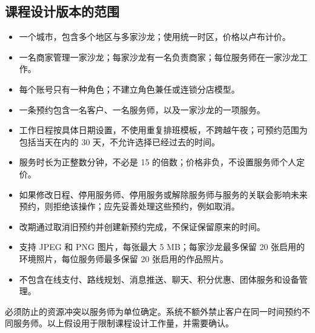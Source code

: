 \subsection{课程设计版本的范围}
\begin{itemize}
\item 一个城市，包含多个地区与多家沙龙；使用统一时区，价格以卢布计价。
\item 一名商家管理一家沙龙；每家沙龙有一名负责商家；每位服务师在一家沙龙工作。
\item 每个账号只有一种角色；不建立角色兼任或连锁分店模型。
\item 一条预约包含一名客户、一名服务师，以及一家沙龙的一项服务。
\item 工作日程按具体日期设置，不使用重复排班模板，不跨越午夜；可预约范围为包括当天在内的 30 天，不允许选择已经过去的时间。
\item 服务时长为正整数分钟，不必是 15 的倍数；价格非负，不设置服务师个人定价。
\item 如果修改日程、停用服务师、停用服务或解除服务师与服务的关联会影响未来预约，则拒绝该操作；应先妥善处理这些预约，例如取消。
\item 改期通过取消旧预约并创建新预约完成，不保证保留原来的时间。
\item 支持 JPEG 和 PNG 图片，每张最大 5 MB；每家沙龙最多保留 20 张启用的环境照片，每位服务师最多保留 20 张启用的作品照片。
\item 不包含在线支付、路线规划、消息推送、聊天、积分优惠、团体服务和设备管理。
\end{itemize}
必须防止的资源冲突以服务师为单位确定。系统不额外禁止客户在同一时间预约不同服务师。以上假设用于限制课程设计工作量，并需要确认。

